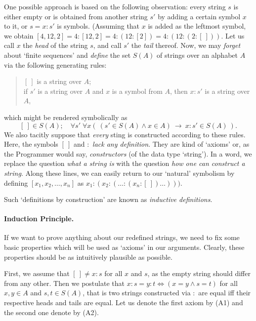 \documentclass[12pt,notitlepage]{article}
\theoremstyle{plain}
\theoremstyle{definition}
\theoremstyle{plain}
\newcommand{\1}{\mathbf{1}}
\newcommand{\0}{\mathbf{0}}
\begin{document}
One possible approach is based on the following observation: every string $s$ is either empty or is obtained from another string $s'$ by adding a certain symbol $x$ to it, or $s = x : s'$ is symbols. (Assuming that $x$ is added as the leftmost symbol, we obtain $[4,12, 2] = 4 : [12, 2] = 4 : (12 : [2]) = 4 : (12 : (2 : [\ ]))$. Let us call $x$ the \emph{head} of the string $s$, and call $s'$ the \emph{tail} thereof. Now, we may \emph{forget} about `finite sequences' and \emph{define} the set $S(A)$ of strings over an alphabet $A$ via the following generating rules:
\begin{quote}
$[\ ]$ is a string over $A$;\\
if $s'$ is a string over $A$ and $x$ is a symbol from $A$, then $x : s'$ is a string over $A$,
\end{quote}
which might be rendered symbolically as
$$[\ ] \in S(A);\quad \forall s'\; \forall x \left(\ (s' \in  S(A) \wedge  x \in A)\ \to\ x : s' \in S(A)\  \right).$$
We also tacitly suppose that \emph{every} sting is constructed according to these rules. Here, the symbols $[\ ]$ and $:$ \emph{lack any definition}. They are kind of `axioms' or, as the Programmer would say, \emph{constructors} (of the data type `string'). In a word, we replace the question \emph{what a string is} with the question \emph{how one can construct a string}. Along these lines, we can easily return to our `natural' symbolism by defining $[x_1, x_2, \ldots, x_n]$ as $x_1 : (x_2 : (\ldots : (x_n : [\ ])\ldots)))$.

Such `definitions by construction' are known as \emph{inductive definitions}.

\paragraph{Induction Principle.} If we want to prove anything about our redefined strings, we need to fix some basic properties which will be used as `axioms' in our arguments. Clearly, these properties should be as intuitively plausible as possible.

First, we assume that $[\ ] \neq x : s$ for all $x$ and $s$, as the empty string should differ from any other. Then we postulate that $x : s = y : t \iff (x = y \wedge s = t)$ for all $x, y \in A$ and $s, t \in S(A)$, that is two strings constructed via $:$ are equal iff their respective heads and tails are equal. Let us denote the first axiom by (A1) and the second one denote by (A2).
\end{document}
